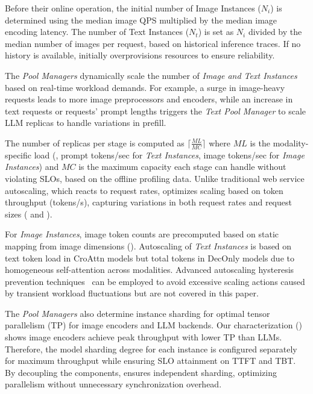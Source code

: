 Before their online operation, the initial number of Image Instances ($N_i$) is determined using the median image QPS multiplied by the median image encoding latency.
The number of Text Instances ($N_t$) is set as $N_i$ divided by the median number of images per request, based on historical \lmm{} inference traces.
If no history is available, \sysname{} initially overprovisions resources to ensure reliability.

The \emph{Pool Managers} dynamically scale the number of \emph{Image and Text Instances} based on real-time workload demands.
For example, a surge in image-heavy requests leads to more image preprocessors and encoders, while an increase in text requests or requests' prompt lengths triggers the \emph{Text Pool Manager} to scale LLM replicas to handle variations in prefill.

The number of replicas per stage is computed as $\lceil{\frac{ML}{MC}}\rceil$
where $ML$ is the modality-specific load (\eg{}, prompt tokens/sec for \emph{Text Instances}, image tokens/sec for \emph{Image Instances}) and $MC$ is the maximum capacity each stage can handle without violating SLOs, based on the offline \lmm{} profiling data.
Unlike traditional web service autoscaling, which reacts to request rates, \sysname{} optimizes scaling based on token throughput (tokens/s), capturing variations in both request rates and request sizes ( and ).

For \emph{Image Instances}, image token counts are precomputed based on static mapping from image dimensions ().
Autoscaling of \emph{Text Instances} is based on text token load in CroAttn models but total tokens in DecOnly models due to homogeneous self-attention across modalities.
Advanced autoscaling hysteresis prevention techniques~\cite{optscaler} can be employed to avoid excessive scaling actions caused by transient workload fluctuations but are not covered in this paper.

The \emph{Pool Managers} also determine instance sharding for optimal tensor parallelism (TP) for image encoders and LLM backends.
Our characterization () shows image encoders achieve peak throughput with lower TP than LLMs.
Therefore, the model sharding degree for each instance is configured separately for maximum throughput while ensuring SLO attainment on TTFT and TBT.
By decoupling the components, \sysname{} ensures independent sharding, optimizing parallelism without unnecessary synchronization overhead.

